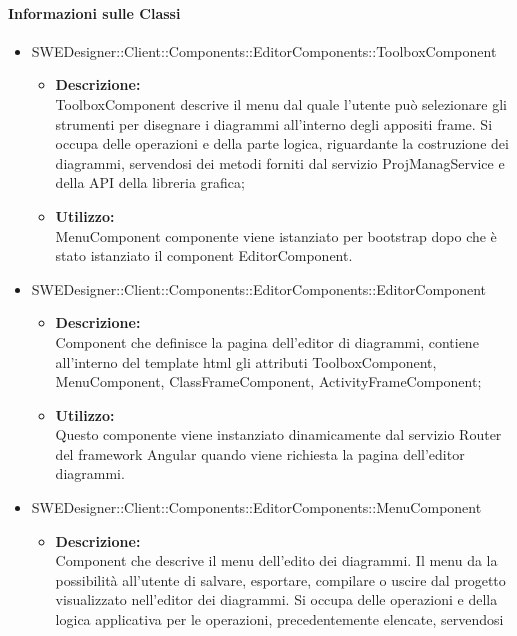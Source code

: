 		\paragraph{Informazioni sulle Classi}
		\begin{itemize}
			\item SWEDesigner::Client::Components::EditorComponents::ToolboxComponent
			\begin{itemize}
				\item \textbf{Descrizione: }\\
				ToolboxComponent descrive il menu dal quale l'utente può selezionare gli
				strumenti per disegnare i diagrammi all'interno degli appositi frame. Si
				occupa delle operazioni e della parte logica, riguardante la costruzione
				dei diagrammi, servendosi dei metodi forniti dal servizio ProjManagService e
				della API della libreria grafica;
				\item \textbf{Utilizzo: }\\
				MenuComponent componente viene istanziato per bootstrap dopo che è stato
				istanziato il component EditorComponent.
			\end{itemize}
			\item SWEDesigner::Client::Components::EditorComponents::EditorComponent
			\begin{itemize}
				\item \textbf{Descrizione: }\\
				Component che definisce la pagina dell'editor di diagrammi, contiene all'interno
				del template html gli attributi ToolboxComponent, MenuComponent,
				ClassFrameComponent, ActivityFrameComponent;
				\item \textbf{Utilizzo: }\\
				Questo componente viene instanziato dinamicamente dal servizio Router del
				framework Angular quando viene richiesta la pagina dell'editor diagrammi.
			\end{itemize}
			\item SWEDesigner::Client::Components::EditorComponents::MenuComponent
			\begin{itemize}
				\item \textbf{Descrizione: }\\
				Component che descrive il menu dell'edito dei diagrammi. Il menu da la
				possibilità all'utente di salvare, esportare, compilare o uscire dal progetto
				visualizzato nell'editor dei diagrammi. Si occupa delle operazioni e della
				logica applicativa per le operazioni, precedentemente elencate, servendosi

\end{itemize}
\end{itemize}
